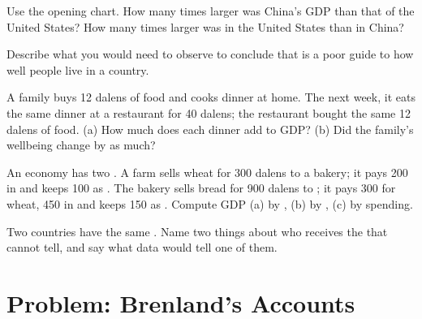 \begin{exercise}[$\star\star$]\label{exo:g8:gdp:8}
Use the opening chart. How many times larger was China's GDP than that of the United States? How
many times larger was  in the United States than in China?
\end{exercise}

\begin{exercise}[$\star\star$]\label{exo:g8:gdp:9}
Describe what you would need to observe to conclude that  is a poor guide to how
well people live in a country.
\end{exercise}

\begin{exercise}[$\star\star\star$]\label{exo:g8:gdp:10}
A family buys 12 dalens of food and cooks dinner at home. The next week, it eats the same dinner at
a restaurant for 40 dalens; the restaurant bought the same 12 dalens of food. (a) How much does
each dinner add to GDP? (b) Did the family's wellbeing change by as much?
\end{exercise}

\begin{exercise}[$\star\star\star$]\label{exo:g8:gdp:11}
An economy has two . A farm sells wheat for 300 dalens to a bakery; it pays 200 in  and
keeps 100 as . The bakery sells bread for 900 dalens to ; it pays 300 for wheat,
450 in  and keeps 150 as . Compute GDP (a) by , (b) by , (c) by
spending.
\end{exercise}

\begin{exercise}[$\star\star\star$]\label{exo:g8:gdp:12}
Two countries have the same . Name two things about who receives the  that  cannot tell, and say what data would tell one of them.
\end{exercise}

\section{Problem: Brenland's Accounts}

